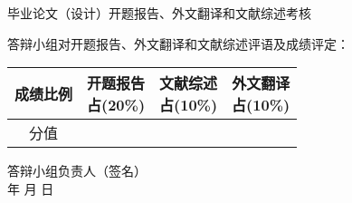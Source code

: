\thispagestyle{empty}
\begin{center}
\stfangsong\sanhao 毕业论文（设计）开题报告、外文翻译和文献综述考核
\end{center}
\songti\sihao 答辩小组对开题报告、外文翻译和文献综述评语及成绩评定：
\vspace{8cm}

{
\hspace{3cm} \songti\xiaosi
\begin{tabular}{|c|c|c|c|}
    \hline
    成绩比例 & \parbox[t]{4em}{开题报告\\[-3.5em]占(20\%)} &
               \parbox[t]{4em}{文献综述\\[-3.5em]占(10\%)} &
               \parbox[t]{4em}{外文翻译\\[-3.5em]占(10\%)} \\

    \hline
    分值   & & &  \\
    \hline
\end{tabular}
}
\vspace{2cm}
\begin{flushright}
    答辩小组负责人（签名）\;\underline{\hspace{4em}}\\
    年 \quad 月 \quad 日
\end{flushright}

